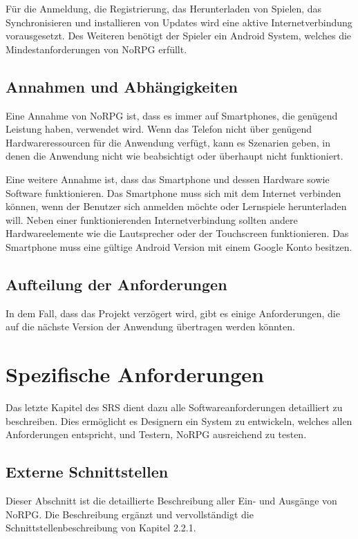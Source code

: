 		Für die Anmeldung, die Registrierung, das Herunterladen von Spielen, das Synchronisieren und installieren von Updates wird eine aktive Internetverbindung vorausgesetzt. Des Weiteren benötigt der Spieler ein Android System, welches die Mindestanforderungen von NoRPG erfüllt.
				
	\subsection{Annahmen und Abhängigkeiten}
		Eine Annahme von NoRPG ist, dass es immer auf Smartphones, die genügend Leistung haben, verwendet wird. Wenn das Telefon nicht über genügend Hardwareressourcen für die Anwendung verfügt, kann es Szenarien geben, in denen die Anwendung nicht wie beabsichtigt oder überhaupt nicht funktioniert.
		
		Eine weitere Annahme ist, dass das Smartphone und dessen Hardware sowie Software funktionieren. Das Smartphone muss sich mit dem Internet verbinden können, wenn der Benutzer sich anmelden möchte oder Lernspiele herunterladen will. Neben einer funktionierenden Internetverbindung sollten andere Hardwareelemente wie die Lautsprecher oder der Touchscreen funktionieren. Das Smartphone muss eine gültige Android Version mit einem Google Konto besitzen.
		
	\subsection{Aufteilung der Anforderungen}
		In dem Fall, dass das Projekt verzögert wird, gibt es einige Anforderungen, die auf die nächste Version der Anwendung übertragen werden könnten.

\section{Spezifische Anforderungen}
	Das letzte Kapitel des SRS dient dazu alle Softwareanforderungen detailliert zu beschreiben. Dies ermöglicht es Designern ein System zu entwickeln, welches allen Anforderungen entspricht, und Testern, NoRPG ausreichend zu testen.
	
	\subsection{Externe Schnittstellen}
		Dieser Abschnitt ist die detaillierte Beschreibung aller Ein- und Ausgänge von NoRPG. Die Beschreibung ergänzt und vervollständigt die Schnittstellenbeschreibung von Kapitel 2.2.1. 
	

